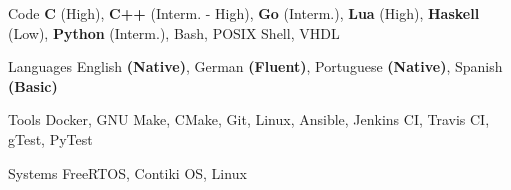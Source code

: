 
\begin{cvskills}
  \cvskill
    {Code} %
    {\textbf{C} (High),
     \textbf{C++} (Interm. - High),
     \textbf{Go} (Interm.),
     \textbf{Lua} (High),
     \textbf{Haskell} (Low),
     \textbf{Python} (Interm.),
     Bash, POSIX Shell,
     VHDL}

  \cvskill
    {Languages} %
    {English \textbf{(Native)}, German \textbf{(Fluent)}, Portuguese \textbf{(Native)}, Spanish \textbf{(Basic)}} %

  \cvskill
    {Tools} %
    {Docker, GNU Make, CMake, Git, Linux, Ansible, Jenkins CI, Travis CI, gTest, PyTest} %

  \cvskill
    {Systems} %
    {FreeRTOS, Contiki OS, Linux} %
\end{cvskills}
